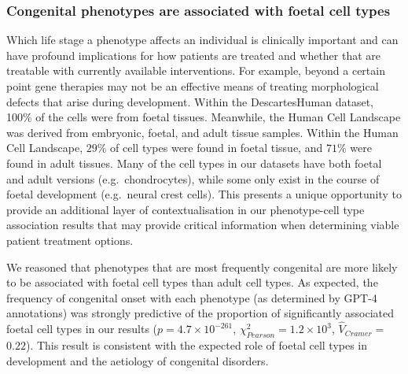 \documentclass[
]{article}
\begin{document}
\subsubsection{Congenital phenotypes are associated with foetal cell
types}\label{congenital-phenotypes-are-associated-with-foetal-cell-types}

Which life stage a phenotype affects an individual is clinically
important and can have profound implications for how patients are
treated and whether that are treatable with currently available
interventions. For example, beyond a certain point gene therapies may
not be an effective means of treating morphological defects that arise
during development. Within the DescartesHuman dataset, 100\% of the
cells were from foetal tissues. Meanwhile, the Human Cell Landscape was
derived from embryonic, foetal, and adult tissue samples. Within the
Human Cell Landscape, \(29\)\% of cell types were found in foetal
tissue, and \(71\)\% were found in adult tissues. Many of the cell types
in our datasets have both foetal and adult versions (e.g.~chondrocytes),
while some only exist in the course of foetal development (e.g.~neural
crest cells). This presents a unique opportunity to provide an
additional layer of contextualisation in our phenotype-cell type
association results that may provide critical information when
determining viable patient treatment options.

We reasoned that phenotypes that are most frequently congenital are more
likely to be associated with foetal cell types than adult cell types. As
expected, the frequency of congenital onset with each phenotype (as
determined by GPT-4 annotations) was strongly predictive of the
proportion of significantly associated foetal cell types in our results
(\(p=\)\(4.7 \times 10^{-261}\),
\(\chi^2_{Pearson}=\)\(1.2 \times 10^{3}\),
\(\hat{V}_{Cramer}=\)\(0.22\)). This result is consistent with the
expected role of foetal cell types in development and the aetiology of
congenital disorders.
\end{document}
